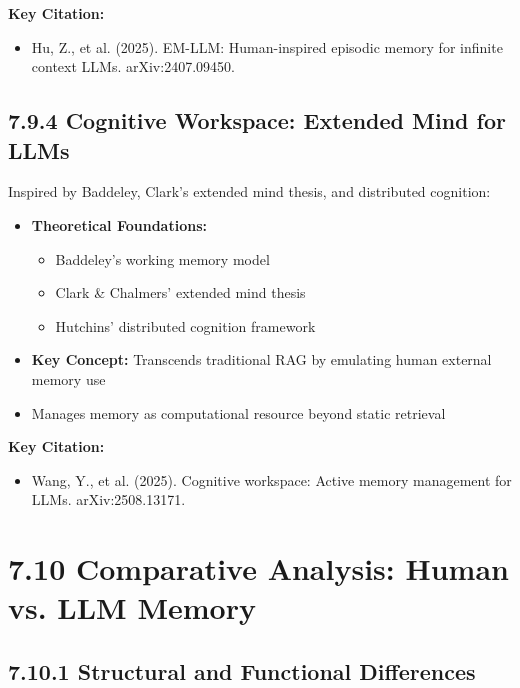 \documentclass[11pt,letterpaper]{article}
\begin{document}
\textbf{Key Citation:}
\begin{itemize}[leftmargin=*]
    \item Hu, Z., et al. (2025). EM-LLM: Human-inspired episodic memory for infinite context LLMs. arXiv:2407.09450.
\end{itemize}

\subsection{7.9.4 Cognitive Workspace: Extended Mind for LLMs}

Inspired by Baddeley, Clark's extended mind thesis, and distributed cognition:

\begin{itemize}[leftmargin=*]
    \item \textbf{Theoretical Foundations:}
    \begin{itemize}
        \item Baddeley's working memory model
        \item Clark \& Chalmers' extended mind thesis
        \item Hutchins' distributed cognition framework
    \end{itemize}
    \item \textbf{Key Concept:} Transcends traditional RAG by emulating human external memory use
    \item Manages memory as computational resource beyond static retrieval
\end{itemize}

\textbf{Key Citation:}
\begin{itemize}[leftmargin=*]
    \item Wang, Y., et al. (2025). Cognitive workspace: Active memory management for LLMs. arXiv:2508.13171.
\end{itemize}

\section{\color{garnet}7.10 Comparative Analysis: Human vs. LLM Memory}

\subsection{7.10.1 Structural and Functional Differences}
\end{document}
